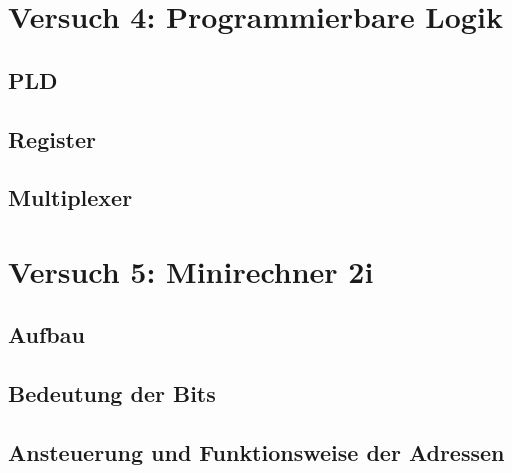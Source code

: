 \documentclass[paper=a4, fontsize=11pt]{scrartcl}
\numberwithin{equation}{section}
\numberwithin{figure}{section}
\numberwithin{table}{section}
\begin{document}
\newpage

\section{Versuch 4: Programmierbare Logik}


\subsection{PLD}


\subsection{Register}


\subsection{Multiplexer}


\newpage

\section{Versuch 5: Minirechner 2i}


\subsection{Aufbau}


\subsection{Bedeutung der Bits}


\subsection{Ansteuerung und Funktionsweise der Adressen}
\end{document}
